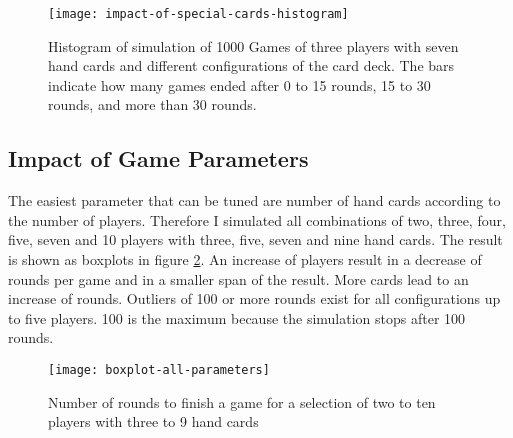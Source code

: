 \begin{figure}[h!]
  \caption{Histogram of simulation of 1000 Games of three players with seven hand cards and different configurations of the card deck. The bars indicate how many games ended after 0 to 15 rounds, 15 to 30 rounds, and more than 30 rounds.}
  \centering
  \texttt{[image: impact-of-special-cards-histogram]}
  \label{fig:impact-of-special-cards-hist}
\end{figure}


\subsection{Impact of Game Parameters}

The easiest parameter that can be tuned are number of hand cards according to the number of players. Therefore I simulated all combinations of two, three, four, five, seven and 10 players with three, five, seven and nine hand cards. The result is shown as boxplots in figure \ref{fig:boxplot-all-parameters}. An increase of players result in a decrease of rounds per game and in a smaller span of the result. More cards lead to an increase of rounds. Outliers of 100 or more rounds exist for all configurations up to five players. 100 is the maximum because the simulation stops after 100 rounds.



\begin{figure}[h!]
  \caption{Number of rounds to finish a game for a selection of two to ten players with three to 9 hand cards}
  \centering
  \texttt{[image: boxplot-all-parameters]}
  \label{fig:boxplot-all-parameters}
\end{figure}


%
%
%
%
